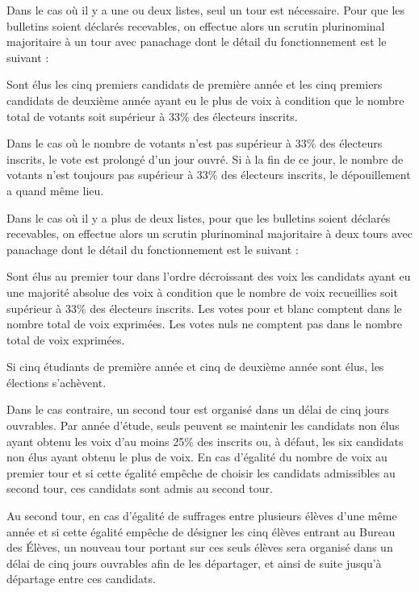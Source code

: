 \documentclass{article} %
\begin{document}
				Dans le cas où il y a une ou deux listes, seul un tour est
				nécessaire. Pour que les bulletins soient déclarés recevables, on
				effectue alors un scrutin plurinominal majoritaire à un tour avec
				panachage dont le détail du fonctionnement est le suivant :

				Sont élus les cinq premiers candidats de première année et les cinq
				premiers candidats de deuxième année ayant eu le plus de voix à
				condition que le nombre total de votants soit supérieur à 33\% des
				électeurs inscrits.

				Dans le cas où le nombre de votants n’est pas supérieur à 33\% des
				électeurs inscrits, le vote est prolongé d’un jour ouvré. Si à la fin
				de ce jour, le nombre de votants n’est toujours pas supérieur à 33\%
				des électeurs inscrits, le dépouillement a quand même lieu.

				Dans le cas où il y a plus de deux listes, pour que les bulletins
				soient déclarés recevables, on effectue alors un scrutin plurinominal
				majoritaire à deux tours avec panachage dont le détail du
				fonctionnement est le suivant :

				Sont élus au premier tour dans l’ordre décroissant des voix les
				candidats ayant eu une majorité absolue des voix à condition que le
				nombre de voix recueillies soit supérieur à 33\% des électeurs
				inscrits. Les votes pour et blanc comptent dans le nombre total de
				voix exprimées. Les votes nuls ne comptent pas dans le nombre total
				de voix exprimées.

				Si cinq étudiants de première année et cinq de deuxième année sont
				élus, les élections s’achèvent.

				Dans le cas contraire, un second tour est organisé dans un délai de
				cinq jours ouvrables. Par année d’étude, seuls peuvent se maintenir
				les candidats non élus ayant obtenu les voix d’au moins 25\% des
				inscrits ou, à défaut, les six candidats non élus ayant obtenu le
				plus de voix. En cas d’égalité du nombre de voix au premier tour et
				si cette égalité empêche de choisir les candidats admissibles au
				second tour, ces candidats sont admis au second tour.

				Au second tour, en cas d'égalité de suffrages entre plusieurs élèves
				d'une même année et si cette égalité empêche de désigner les cinq
				élèves entrant au Bureau des Élèves, un nouveau tour portant sur ces
				seuls élèves sera organisé dans un délai de cinq jours ouvrables afin
				de les départager, et ainsi de suite jusqu’à départage entre ces
				candidats.
\end{document}
